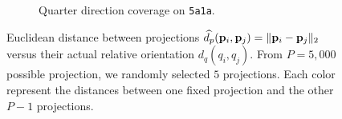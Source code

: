 \begin{figure}
\begin{minipage}[t]{0.99\linewidth}
\begin{subfigure}[t]{0.33\textwidth}
            \caption{Quarter direction coverage on \texttt{5a1a}.}%
            \label{fig:euclidean-not-robust:5a1a-quarter}
        \end{subfigure}
        \caption{%
            Euclidean distance between projections $\widehat{d_p}(\mathbf{p}_i, \mathbf{p}_j) = \| \mathbf{p}_i - \mathbf{p}_j \|_2$ versus their actual relative orientation $d_q(q_i, q_j)$.
            From $P = 5,000$ possible projection, we randomly selected $5$ projections.
            Each color represent the distances between one fixed projection and the other $P-1$ projections.
        }\label{fig:euclidean-not-robust}
    \end{minipage}
\end{figure}



